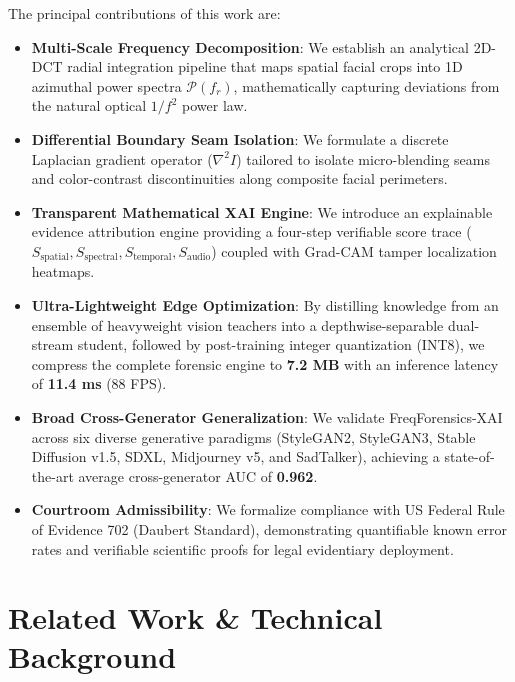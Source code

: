 \documentclass[journal]{IEEEtran}
\begin{document}
The principal contributions of this work are:
\begin{itemize}
    \item \textbf{Multi-Scale Frequency Decomposition}: We establish an analytical 2D-DCT radial integration pipeline that maps spatial facial crops into 1D azimuthal power spectra $\mathcal{P}(f_r)$, mathematically capturing deviations from the natural optical $1/f^2$ power law.
    \item \textbf{Differential Boundary Seam Isolation}: We formulate a discrete Laplacian gradient operator ($\nabla^2 I$) tailored to isolate micro-blending seams and color-contrast discontinuities along composite facial perimeters.
    \item \textbf{Transparent Mathematical XAI Engine}: We introduce an explainable evidence attribution engine providing a four-step verifiable score trace ($S_{\text{spatial}}, S_{\text{spectral}}, S_{\text{temporal}}, S_{\text{audio}}$) coupled with Grad-CAM tamper localization heatmaps.
    \item \textbf{Ultra-Lightweight Edge Optimization}: By distilling knowledge from an ensemble of heavyweight vision teachers into a depthwise-separable dual-stream student, followed by post-training integer quantization (INT8), we compress the complete forensic engine to \textbf{7.2 MB} with an inference latency of \textbf{11.4 ms} (88 FPS).
    \item \textbf{Broad Cross-Generator Generalization}: We validate FreqForensics-XAI across six diverse generative paradigms (StyleGAN2, StyleGAN3, Stable Diffusion v1.5, SDXL, Midjourney v5, and SadTalker), achieving a state-of-the-art average cross-generator AUC of \textbf{0.962}.
    \item \textbf{Courtroom Admissibility}: We formalize compliance with US Federal Rule of Evidence 702 (Daubert Standard), demonstrating quantifiable known error rates and verifiable scientific proofs for legal evidentiary deployment.
\end{itemize}

\section{Related Work \& Technical Background}
\end{document}

